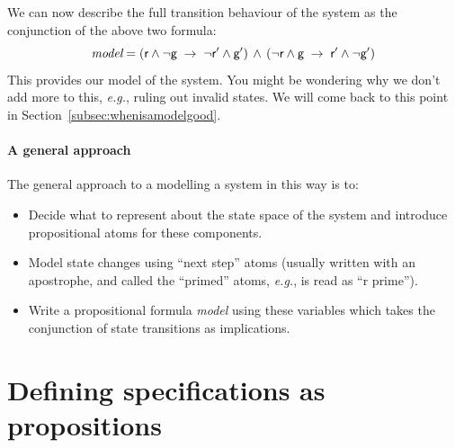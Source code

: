 \documentclass{article}
\theoremstyle{definition}
\newcommand{\eg}{\emph{e.g.}}
\begin{document}
We can now describe the full transition behaviour of the system as
the conjunction of the above two formula:
%
\begin{equation*}
\textit{model} =
(\textsf{r}{} \wedge \neg\textsf{g}{} \; \rightarrow \; \neg\textsf{r}{}' \wedge
\textsf{g}{}')
\, \wedge \,
(\neg\textsf{r}{} \wedge \textsf{g}{} \; \rightarrow \; \textsf{r}{}' \wedge \neg\textsf{g}{}')
\end{equation*}
%
This provides our model of the system. You might be wondering why we
don't add more to this, \eg{}, ruling out invalid states. We will come
back to this point in Section~\ref{subsec:whenisamodelgood}.


\paragraph{A general approach}

The general approach to a modelling a system in this way is to:
%
\begin{itemize}
  \item Decide what to represent about the state space of the system
  and introduce propositional atoms for these components.
  \item Model state changes using ``next step'' atoms (usually written with
  an apostrophe, and called the ``primed'' atoms, \eg{}, \atomrp{} is
  read as ``r prime'').
 \item Write a propositional formula \emph{model} using these
  variables which takes the conjunction of state transitions as implications.
\end{itemize}

\section{Defining specifications as propositions}
\label{sec:spec}
\end{document}
